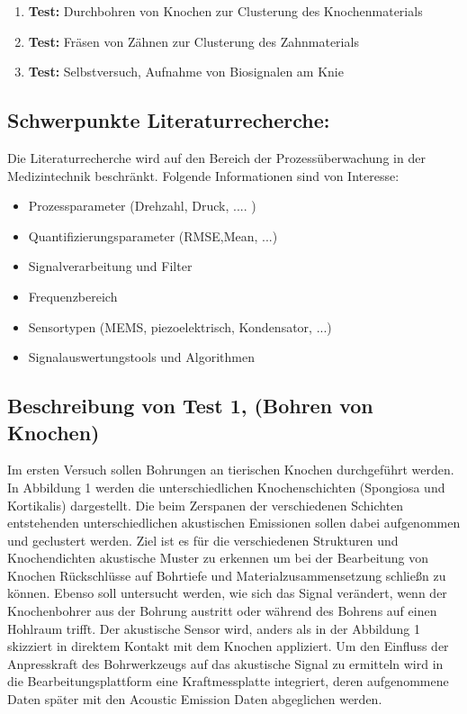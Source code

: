 \documentclass[twoside, 12pt, a4paper]{article}
\begin{document}
\begin{enumerate}
	\item{\textbf{Test:} Durchbohren von Knochen zur Clusterung des Knochenmaterials  }
	\item{\textbf{Test:} Fr\"asen von Z\"ahnen zur Clusterung des Zahnmaterials}
	\item{\textbf{Test:} Selbstversuch, Aufnahme von Biosignalen am Knie}
\end{enumerate}


\subsection{Schwerpunkte Literaturrecherche:}

Die Literaturrecherche wird auf den Bereich der Prozess\"uberwachung in der Medizintechnik beschr\"ankt. Folgende Informationen sind von Interesse: 

\begin{itemize}
	\item{Prozessparameter (Drehzahl, Druck, .... )}
	\item{Quantifizierungsparameter (RMSE,Mean, ...)}
	\item{Signalverarbeitung und Filter }
	\item{Frequenzbereich } 
	\item{Sensortypen (MEMS, piezoelektrisch, Kondensator, ...) }
	\item{Signalauswertungstools und Algorithmen}
\end{itemize}

\subsection{Beschreibung von Test 1, (Bohren von Knochen)}

Im ersten Versuch sollen Bohrungen an tierischen Knochen durchgef\"uhrt werden. In Abbildung 1 werden die unterschiedlichen Knochenschichten (Spongiosa und Kortikalis) dargestellt. Die beim Zerspanen der verschiedenen Schichten entstehenden unterschiedlichen akustischen Emissionen sollen dabei aufgenommen und geclustert werden. Ziel ist es f\"ur die verschiedenen Strukturen und Knochendichten akustische Muster zu erkennen um bei der Bearbeitung von Knochen R\"uckschl\"usse auf Bohrtiefe und Materialzusammensetzung schlie{\ss}n zu k\"onnen. Ebenso soll untersucht werden, wie sich das Signal ver\"andert, wenn der Knochenbohrer aus der Bohrung austritt oder w\"ahrend des Bohrens auf einen Hohlraum trifft. Der akustische Sensor wird, anders als in der Abbildung 1 skizziert in direktem Kontakt mit dem Knochen appliziert. Um den Einfluss der Anpresskraft des Bohrwerkzeugs auf das akustische Signal zu ermitteln wird in die Bearbeitungsplattform eine Kraftmessplatte integriert, deren aufgenommene Daten sp\"ater mit den Acoustic Emission Daten abgeglichen werden.
\end{document}
